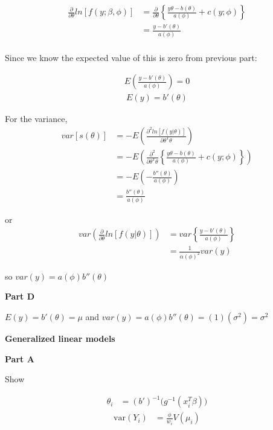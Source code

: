 \documentclass[12pt]{amsart}
\begin{document}
\begin{align*}
   \frac{\partial}{\partial \theta}ln[f(y; \beta, \phi)] &=  \frac{\partial}{\partial \theta} \left\{ \frac{y\theta-b(\theta)}{a(\phi)}+c(y;\phi) \right\}\\
   &= \frac{y-b'(\theta)}{a(\phi)}\\
\end{align*}

Since we know the expected value of this is zero from previous part:

\begin{align*}
   E\left(\frac{y-b'(\theta)}{a(\phi)}\right)=0
\end{align*}
\begin{align*}
   E(y) = b'(\theta)
\end{align*}

For the variance, 
\begin{align*}
    var[s(\theta)] &=-E\left(\frac{\partial^2 ln[f(y|\theta)]}{\partial \theta^T\theta} \right ) \\
    &=-E\left(\frac{\partial^2}{\partial \theta^T\theta}\left\{ \frac{y\theta-b(\theta)}{a(\phi)}+c(y;\phi) \right\} \right )\\
    &=-E\left( -\frac{b''(\theta)}{a(\phi)}\right )\\
    &=  \frac{b''(\theta)}{a(\phi)}
\end{align*}


or 
\begin{align*}
   var( \frac{\partial}{\partial \theta }ln[f(y|\theta)])
    &=var\left\{ \frac{y-b'(\theta)}{a(\phi)}\right\}\\
    &= \frac{1}{\alpha(\phi)^2}var(y)
\end{align*}

so $var(y)=a(\phi)b''(\theta)$


\bigskip
{\bf Part D} \\
\bigskip

$E(y)= b'(\theta)=\mu$ and $var(y)=a(\phi)b''(\theta)=(1)(\sigma^2)=\sigma^2$\\

\bigskip

{\bf \large Generalized linear models} \\
\bigskip
\bigskip

{\bf Part A} \\
\bigskip

Show 

\begin{align*}
\theta_i &= (b')^{-1} \Big( g^{-1}(x_i^T \beta) \Big)  
\end{align*}
\begin{align*}
\mbox{var} (Y_i ) &=  \frac{\phi}{w_i} V(\mu_i)
\end{align*}
\end{document}
